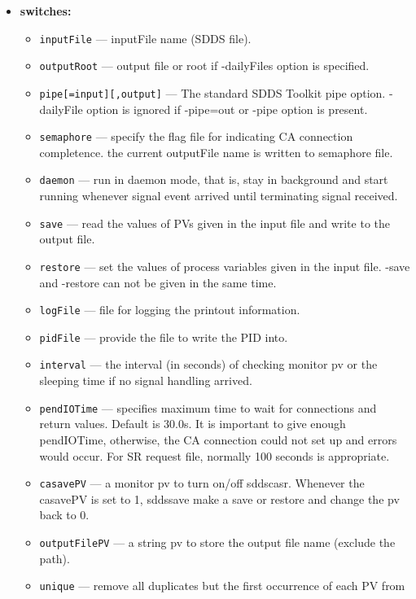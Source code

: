 \begin{itemize}
%
\item {\bf switches:}
%
%
    \begin{itemize}
    \item {\tt inputFile} --- inputFile name (SDDS file).
    \item {\tt outputRoot} --- output file or root if -dailyFiles option is specified.
    \item {\tt pipe[=input][,output]} --- The standard SDDS Toolkit pipe option.
         -dailyFile option is ignored if -pipe=out or -pipe option is present.
    \item {\tt semaphore} --- specify the flag file for indicating CA connection completence.
               the current outputFile name is written to semaphore file.
    \item {\tt daemon} --- run in daemon mode, that is, stay in background and start 
          running whenever signal event arrived until terminating signal received.
    \item {\tt save} --- read the values of PVs given in the input file and write
               to the output file.
    \item {\tt restore} --- set the values of process variables given in the input file.
               -save and -restore can not be given in the same time.
    \item {\tt logFile} --- file for logging the printout information.
    \item {\tt pidFile} --- provide the file to write the PID into.
    \item {\tt interval} --- the interval (in seconds) of checking monitor pv 
               or the sleeping time if no signal handling arrived. 
    \item {\tt pendIOTime} --- specifies maximum time to wait for connections and
               return values. Default is 30.0s. It is important to give enough pendIOTime,
               otherwise, the CA connection could not set up and errors would occur. For SR
               request file, normally 100 seconds is appropriate.
    \item {\tt casavePV} --- a monitor pv to turn on/off sddscasr. Whenever the casavePV is 
               set to 1, sddssave make a save or restore and change the pv back to 0.
    \item {\tt outputFilePV} --- a string pv to store the output file name (exclude the path).
    \item {\tt unique} --- remove all duplicates but the first occurrence of each PV from

\end{itemize}
\end{itemize}
